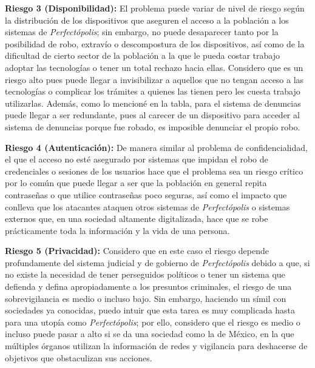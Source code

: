 \begin{enumerateColor}
    \item \textbf{Riesgo 3 (Disponibilidad):} 
	El problema puede variar de nivel de riesgo según la distribución de los dispositivos que aseguren el acceso a la población a los sistemas de \textit{Perfectópolis}; sin embargo, no puede desaparecer tanto por la posibilidad de robo, extravío o descompostura de los dispositivos, así como de la dificultad de cierto sector de la población a la que le pueda costar trabajo adoptar las tecnologías o tener un total rechazo hacia ellas. Considero que es un riesgo alto pues puede llegar a invisibilizar a aquellos que no tengan acceso a las tecnologías o complicar los trámites a quienes las tienen pero les cuesta trabajo utilizarlas. Además, como lo mencioné en la tabla, para el sistema de denuncias puede llegar a ser redundante, pues al carecer de un dispositivo para acceder al sistema de denuncias porque fue robado, es imposible denunciar el propio robo. 	
    \item \textbf{Riesgo 4 (Autenticación):} 
	De manera similar al problema de confidencialidad, el que el acceso no esté asegurado por sistemas que impidan el robo de credenciales o sesiones de los usuarios hace que el problema sea un riesgo crítico por lo común que puede llegar a ser que la población en general repita contraseñas o que utilice contraseñas poco seguras, así como el impacto que conlleva que los atacantes ataquen otros sistemas de \textit{Perfectópolis} o sistemas externos que, en una sociedad altamente digitalizada, hace que se robe prácticamente toda la información y la vida de una persona.
    \item \textbf{Riesgo 5 (Privacidad):} 
	Considero que en este caso el riesgo depende profundamente del sistema judicial y de gobierno de \textit{Perfectópolis} debido a que, si no existe la necesidad de tener perseguidos políticos o tener un sistema que defienda y defina apropiadamente a los presuntos criminales, el riesgo de una sobrevigilancia es medio o incluso bajo. Sin embargo, haciendo un símil con sociedades ya conocidas, puedo intuir que esta tarea es muy complicada hasta para una utopía como \textit{Perfectópolis}; por ello, considero que el riesgo es medio o incluso puede pasar a alto si se da una sociedad como la de México, en la que múltiples órganos utilizan la información de redes y vigilancia para deshacerse de objetivos que obstaculizan sus acciones.


\end{enumerateColor}
